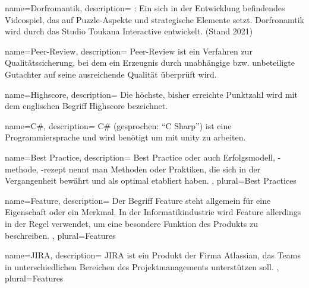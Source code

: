 {
	name=Dorfromantik,
	description={
		\cite{DorfromantikHomepage}: Ein sich in der Entwicklung befindendes Videospiel, das auf Puzzle-Aspekte und strategische Elemente setzt. Dorfronamtik wird durch das Studio Toukana Interactive entwickelt. (Stand 2021)
	}
}

{
	name=Peer-Review,
	description={
		Peer-Review ist ein Verfahren zur Qualitätssicherung, bei dem ein Erzeugnis durch unabhängige bzw. unbeteiligte Gutachter auf seine ausreichende Qualität überprüft wird.
	}
}

{
	name=Highscore,
	description={
		Die höchste, bisher erreichte Punktzahl wird mit dem englischen Begriff Highscore bezeichnet.
	}
}

{
	name=C\#,
	description={
		C\# (gesprochen: \enquote{C Sharp}) ist eine Programmiersprache und wird benötigt um mit \gls{unity} zu arbeiten.
	}
}

{
	name=Best Practice,
	description={
		Best Practice oder auch Erfolgsmodell, -methode, -rezept nennt man Methoden oder Praktiken, die sich in der Vergangenheit bewährt und als optimal etabliert haben.
	},
	plural={Best Practices}
}

{
	name=Feature,
	description={
		Der Begriff Feature steht allgemein für eine Eigenschaft oder ein Merkmal. In der Informatikindustrie wird Feature allerdings in der Regel verwendet, um eine besondere Funktion des Produkts zu beschreiben.
	},
	plural={Features}
}

{
	name=JIRA,
	description={
		JIRA ist ein Produkt der Firma Atlassian, das Teams in unterschiedlichen Bereichen des Projektmanagements unterstützen soll.
	},
	plural={Features}
}

